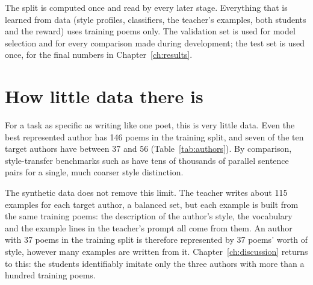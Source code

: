 The split is computed once and read by every later stage. Everything that
is learned from data (style profiles, classifiers, the teacher's examples,
both students and the reward) uses training poems only. The validation set
is used for model selection and for every comparison made during
development; the test set is used once, for the final numbers in
Chapter~\ref{ch:results}.

\section{How little data there is}

For a task as specific as writing like one poet, this is very little data.
Even the best represented author has 146 poems in the training split, and
seven of the ten target authors have between 37 and 56
(Table~\ref{tab:authors}). By comparison, style-transfer benchmarks such as
 have tens of thousands of
parallel sentence pairs for a single, much coarser style distinction.

The synthetic data does not remove this limit. The teacher writes about
115 examples for each target author, a balanced set, but each example is
built from the same training poems: the description of the author's style,
the vocabulary and the example lines in the teacher's prompt all come from
them. An author with 37 poems in the training split is therefore
represented by 37 poems' worth of style, however many examples are written
from it. Chapter~\ref{ch:discussion} returns to this: the students
identifiably imitate only the three authors with more than a hundred
training poems.
